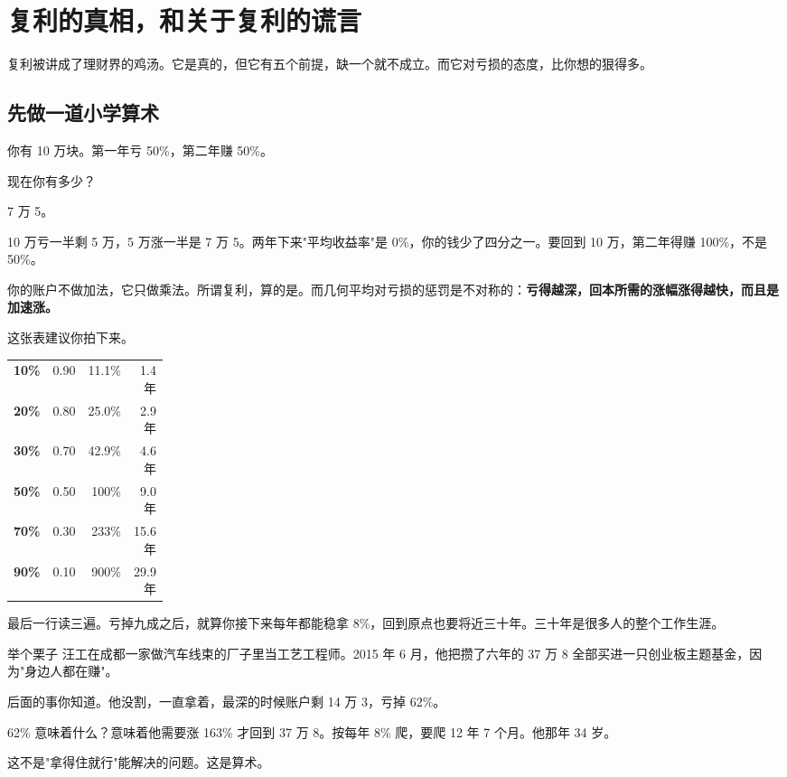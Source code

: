 \chapter{复利的真相，和关于复利的谎言}

\begin{ledetext}
复利被讲成了理财界的鸡汤。它是真的，但它有五个前提，缺一个就不成立。而它对亏损的态度，比你想的狠得多。
\end{ledetext}

\section{先做一道小学算术}

你有 10 万块。第一年亏 50\%，第二年赚 50\%。

现在你有多少？

7 万 5。

10 万亏一半剩 5 万，5 万涨一半是 7 万 5。两年下来"平均收益率"是 0\%，你的钱少了四分之一。要回到 10 万，第二年得赚 100\%，不是 50\%。

你的账户不做加法，它只做乘法。所谓复利，算的是。而几何平均对亏损的惩罚是不对称的：\textbf{亏得越深，回本所需的涨幅涨得越快，而且是加速涨。}

这张表建议你拍下来。

\begin{tablewrap}
\begin{xltabular}{\linewidth}{>{\raggedright\arraybackslash}p{0.20\linewidth}Xrr}
\toprule
{} &  &  &  \\
\midrule
\textbf{10\%} & 0.90 & 11.1\% & 1.4 年 \\
\textbf{20\%} & 0.80 & 25.0\% & 2.9 年 \\
\textbf{30\%} & 0.70 & 42.9\% & 4.6 年 \\
\textbf{50\%} & 0.50 & 100\% & 9.0 年 \\
\textbf{70\%} & 0.30 & 233\% & 15.6 年 \\
\textbf{90\%} & 0.10 & 900\% & 29.9 年 \\
\bottomrule
\end{xltabular}
\end{tablewrap}

最后一行读三遍。亏掉九成之后，就算你接下来每年都能稳拿 8\%，回到原点也要将近三十年。三十年是很多人的整个工作生涯。

\begin{egbox}{举个栗子}
汪工在成都一家做汽车线束的厂子里当工艺工程师。2015 年 6 月，他把攒了六年的 37 万 8 全部买进一只创业板主题基金，因为"身边人都在赚"。

后面的事你知道。他没割，一直拿着，最深的时候账户剩 14 万 3，亏掉 62\%。

62\% 意味着什么？意味着他需要涨 163\% 才回到 37 万 8。按每年 8\% 爬，要爬 12 年 7 个月。他那年 34 岁。

这不是"拿得住就行"能解决的问题。这是算术。

\end{egbox}

